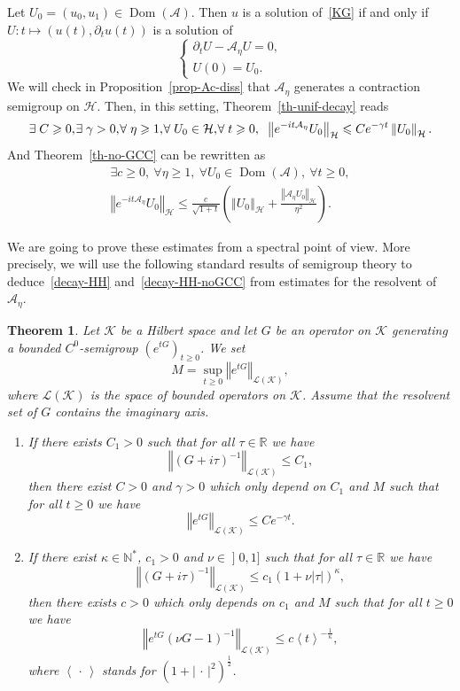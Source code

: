 \documentclass[10pt]{amsart}
\newtheorem{theo}{Theorem}[section]
\theoremstyle{definition}\newtheorem{defi}[theo]{Definition}\newtheorem{rema}[theo]{Remark}\newtheorem{exam}[theo]{Example}\newtheorem{exem}[theo]{Example}\newtheorem{nota}[theo]{Notation}
\newcommand{\abs}[1]{\left\vert #1\right\vert}
\newcommand{\nr}[1]{\left\Vert #1\right\Vert}
\newcommand{\pppg}[1] {\left< #1 \right>}
\renewcommand{\leq}{\leqslant}
\renewcommand{\geq}{\geqslant}
\newcommand{\inv}{^{-1}}
\newcommand{\1}{\mathds 1}
\DeclareMathOperator{\Dom}{Dom}
\newcommand{\R}{\mathbb{R}}
\newcommand{\N}{\mathbb{N}}
\newcommand{\g}{\gamma}
\renewcommand{\t}{\tau}
\newcommand{\Ac}{{\mathcal A}}
\newcommand{\Kc}{{\mathcal K}}
\newcommand{\Lc}{{\mathcal L}}
\newcommand{\HH}{\mathcal H}
\newcommand*{\Mk}{\mkern -2mu}
\let\oldexists\exists
\renewcommand*{\exists}{\mathrel{\oldexists}}
\let\oldforall\forall
\renewcommand*{\forall}{\mathrel{\oldforall}}
\begin{document}
Let $U_0 = (u_0,u_1) \in \Dom(\Ac)$. Then $u$ is a solution of~\eqref{KG} if and only if $U : t \mapsto (u(t),\partial_t u(t))$ is a solution of
\begin{equation}\label{KG-Ac}
\begin{cases}
\partial_t U - \Ac_\eta U = 0,\\
U(0) = U_0.
\end{cases}
\end{equation}
We will check in Proposition~\ref{prop-Ac-diss} that $\Ac_\eta$ generates a contraction semigroup on $\HH$. Then, in this setting, Theorem~\ref{th-unif-decay} reads
\begin{equation}\label{decay-HH}
\exists C \geq 0,\Mk \exists \gamma > 0,\Mk \forall \eta \geq 1,\Mk \forall U_0 \in \HH,\Mk \forall t \geq 0, \;\; \nr{e^{-it\Ac_\eta} U_0}_{\HH} \leq C e^{-\g t} \nr{U_0}_{\HH}.
\end{equation}
And Theorem~\ref{th-no-GCC} can be rewritten as
\begin{multline}\label{decay-HH-noGCC}
\exists c \geq 0,\ \forall \eta \geq 1,\ \forall U_0 \in \Dom(\Ac),\ \forall t \geq 0,
\\ \nr{e^{-it\Ac_\eta} U_0}_{\HH} \leq \frac c {\sqrt{1+t}} \left(\nr{U_0}_\HH + \frac {\nr{\Ac_\eta U_0}_{\HH}}{\eta^2} \right).
\end{multline}

We are going to prove these estimates from a spectral point of view. More precisely, we will use the following standard results of semigroup theory to deduce~\eqref{decay-HH} and~\eqref{decay-HH-noGCC} from estimates for the resolvent of $\Ac_\eta$.

\begin{theo}\label{th-GPH-BT}
Let $\Kc$ be a Hilbert space and let $G$ be an operator on $\Kc$ generating a bounded $C^0$-semigroup $(e^{tG})_{t \geq 0}$. We set
\[
M = \sup_{t \geq 0} \nr{e^{tG}}_{\Lc(\Kc)},
\]
where $\Lc(\Kc)$ is the space of bounded operators on $\Kc$. Assume that the resolvent set of $G$ contains the imaginary axis.
\begin{enumerate}%
\item If there exists $C_1 > 0$ such that for all $\t \in \R$ we have
\[
\nr{(G+i\t)\inv}_{\Lc(\Kc)} \leq C_1,
\]
then there exist $C > 0$ and $\gamma > 0$ which only depend on $C_1$ and $M$ such that for all $t \geq 0$ we have
\[
\nr{e^{tG}}_{\Lc(\Kc)} \leq C e^{-\gamma t}.
\]
\item If there exist $\kappa \in \N^*$, $c_1 > 0$ and $\nu \in\mathopen{]}0,1]$ such that for all $\t \in \R$ we have
\[
\nr{(G+i\t)\inv}_{\Lc(\Kc)} \leq c_1 (1+ \nu \abs \t)^{\kappa},
\]
then there exists $c > 0$ which only depends on $c_1$ and $M$ such that for all $t \geq 0$ we have
\[
\nr{e^{tG}(\nu G - 1)\inv}_{\Lc(\Kc)} \leq c \pppg t^{-\frac 1 \kappa},
\]
where $\pppg{\,\cdot\,}$ stands for $(1+\abs{\,\cdot\,}^2)^{\frac 12}$.
\end{enumerate}
\end{theo}
\end{document}
